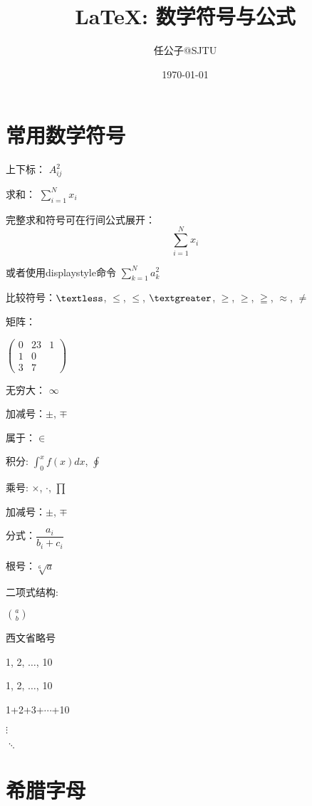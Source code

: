 \documentclass[12pt]{elegantpaper} %
\title{\LaTeX : 数学符号与公式}
\author{任公子@SJTU}
\date{\today}
\numberwithin{equation}{section}
\begin{document}
\maketitle   %

\section{常用数学符号}


上下标： $A_{ij}^{2}$ %


求和： $\sum_{i=1}^{N} x_i$

完整求和符号可在行间公式展开： $$\sum_{i=1}^{N} x_i$$

或者使用displaystyle命令  $\displaystyle \sum_{k=1}^{N} a_k^2$



比较符号：$\textless$, $\le$, $\leq$, $\textgreater$, $\ge$, $\geq$, $\geqq$, $\approx$, $\neq$


矩阵：

$
\begin{pmatrix}
0 & 23 & 1 \\

1 & 0 \\

3 & 7
\end{pmatrix}
$




无穷大： $\infty$

加减号：$\pm$, $\mp$

属于：$\in$

积分: $\int_0^x f(x) dx$, $\oint$

乘号: $\times$, $\cdot$, $\prod$

加减号：$\pm$, $\mp$

分式：$\dfrac{a_i}{b_i+c_i}$

根号：$\sqrt[6]{a}$

二项式结构:

$\binom{a}{b}$


西文省略号

1, 2, $\ldots$, 10

1, 2, $\dots$, 10

1+2+3+$\cdots$+10

$\vdots$

$\ddots$


\section{希腊字母}
\end{document}
